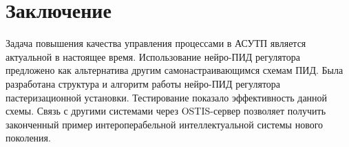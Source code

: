 \chapter*{Заключение}

Задача повышения качества управления процессами в АСУТП является актуальной в настоящее время. Использование нейро-ПИД регулятора предложено как альтернатива другим самонастраивающимся схемам ПИД. Была разработана структура и алгоритм работы нейро-ПИД регулятора пастеризационной установки. Тестирование показало эффективность данной схемы. Связь с другими системами через OSTIS-сервер позволяет получить законченный пример интероперабельной интеллектуальной системы нового поколения.
